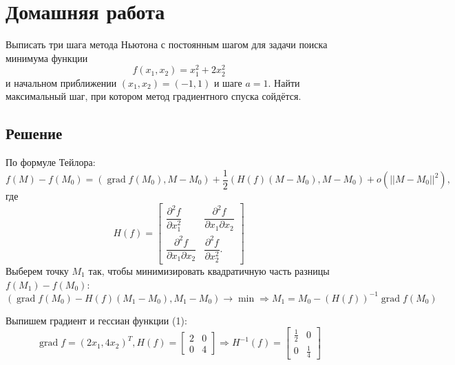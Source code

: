 \documentclass[11pt]{article}
\author{Sergey Makarov}
\date{\today}
\title{}
\newcommand{\grad}{\operatorname{grad}}
\begin{document}
\section{Домашняя работа}
\label{sec:orgca0c065}
Выписать три шага метода Ньютона с постоянным шагом для задачи поиска минимума функции
\begin{equation}
f(x_1, x_2) = x_1^2 + 2x_2^2
\end{equation}
и начальном приближении $(x_1, x_2) = (-1, 1)$ и шаге $a = 1$. Найти максимальный шаг,
при котором метод градиентного спуска сойдётся.
\subsection{Решение}
\label{sec:org2359f54}
По формуле Тейлора:
\begin{equation*}
f(M) - f(M_0) = (\grad f(M_0), M - M_0) + \frac12(H(f)(M - M_0), M - M_0) + o(||M - M_0||^2),
\end{equation*}
где
\begin{equation*}
H(f) = \begin{bmatrix}
\dfrac{\partial^2 f}{\partial x_1^2} & \dfrac{\partial^2 f}{\partial x_1\partial x_2} \\
\dfrac{\partial^2 f}{\partial x_1\partial x_2} & \dfrac{\partial^2 f}{\partial x_2^2}.
\end{bmatrix}
\end{equation*}
Выберем точку $M_1$ так, чтобы минимизировать квадратичную часть разницы $f(M_1) - f(M_0)$:
\begin{equation}
(\grad f(M_0) - H(f)(M_1 - M_0), M_1 - M_0) \rightarrow \min \Rightarrow
M_1 = M_0 - (H(f))^{-1}\grad f(M_0)
\end{equation}

Выпишем градиент и гессиан функции (1):
\begin{equation*}
\grad f = (2x_1, 4x_2)^T,
H(f) = \begin{bmatrix}
2 & 0 \\
0 & 4
\end{bmatrix}
\Rightarrow H^{-1}(f) =
\begin{bmatrix}
\frac12 & 0 \\
0 & \frac14
\end{bmatrix}
\end{equation*}
\end{document}
